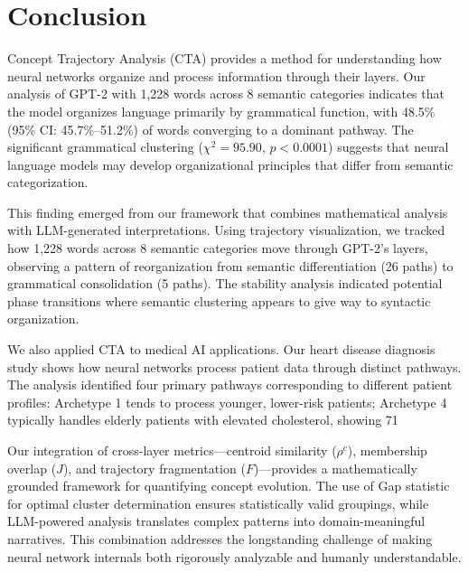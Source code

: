 \section{Conclusion}

Concept Trajectory Analysis (CTA) provides a method for understanding how neural networks organize and process information through their layers. Our analysis of GPT-2 with 1,228 words across 8 semantic categories indicates that the model organizes language primarily by grammatical function, with 48.5\% (95\% CI: 45.7\%–51.2\%) of words converging to a dominant pathway. The significant grammatical clustering ($\chi^2 = 95.90$, $p < 0.0001$) suggests that neural language models may develop organizational principles that differ from semantic categorization.

This finding emerged from our framework that combines mathematical analysis with LLM-generated interpretations. Using trajectory visualization, we tracked how 1,228 words across 8 semantic categories move through GPT-2's layers, observing a pattern of reorganization from semantic differentiation (26 paths) to grammatical consolidation (5 paths). The stability analysis indicated potential phase transitions where semantic clustering appears to give way to syntactic organization.

We also applied CTA to medical AI applications. Our heart disease diagnosis study shows how neural networks process patient data through distinct pathways. The analysis identified four primary pathways corresponding to different patient profiles: Archetype 1 tends to process younger, lower-risk patients; Archetype 4 typically handles elderly patients with elevated cholesterol, showing 71%

Our integration of cross-layer metrics—centroid similarity ($\rho^c$), membership overlap ($J$), and trajectory fragmentation ($F$)—provides a mathematically grounded framework for quantifying concept evolution. The use of Gap statistic for optimal cluster determination ensures statistically valid groupings, while LLM-powered analysis translates complex patterns into domain-meaningful narratives. This combination addresses the longstanding challenge of making neural network internals both rigorously analyzable and humanly understandable.

